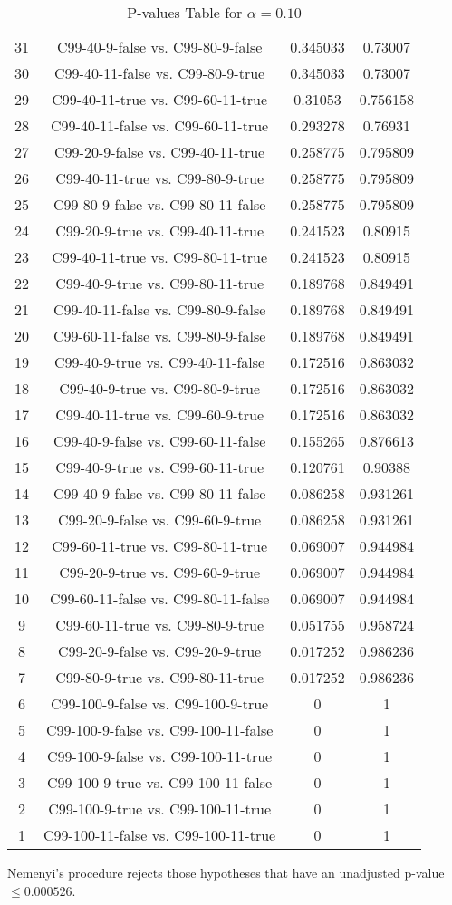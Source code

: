 \documentclass[a4paper,10pt]{article}
\begin{document}
\begin{landscape}
\begin{table}[!htp]
\begin{tabular}{cccc}
31&C99-40-9-false vs. C99-80-9-false&0.345033&0.73007\\
30&C99-40-11-false vs. C99-80-9-true&0.345033&0.73007\\
29&C99-40-11-true vs. C99-60-11-true&0.31053&0.756158\\
28&C99-40-11-false vs. C99-60-11-true&0.293278&0.76931\\
27&C99-20-9-false vs. C99-40-11-true&0.258775&0.795809\\
26&C99-40-11-true vs. C99-80-9-true&0.258775&0.795809\\
25&C99-80-9-false vs. C99-80-11-false&0.258775&0.795809\\
24&C99-20-9-true vs. C99-40-11-true&0.241523&0.80915\\
23&C99-40-11-true vs. C99-80-11-true&0.241523&0.80915\\
22&C99-40-9-true vs. C99-80-11-true&0.189768&0.849491\\
21&C99-40-11-false vs. C99-80-9-false&0.189768&0.849491\\
20&C99-60-11-false vs. C99-80-9-false&0.189768&0.849491\\
19&C99-40-9-true vs. C99-40-11-false&0.172516&0.863032\\
18&C99-40-9-true vs. C99-80-9-true&0.172516&0.863032\\
17&C99-40-11-true vs. C99-60-9-true&0.172516&0.863032\\
16&C99-40-9-false vs. C99-60-11-false&0.155265&0.876613\\
15&C99-40-9-true vs. C99-60-11-true&0.120761&0.90388\\
14&C99-40-9-false vs. C99-80-11-false&0.086258&0.931261\\
13&C99-20-9-false vs. C99-60-9-true&0.086258&0.931261\\
12&C99-60-11-true vs. C99-80-11-true&0.069007&0.944984\\
11&C99-20-9-true vs. C99-60-9-true&0.069007&0.944984\\
10&C99-60-11-false vs. C99-80-11-false&0.069007&0.944984\\
9&C99-60-11-true vs. C99-80-9-true&0.051755&0.958724\\
8&C99-20-9-false vs. C99-20-9-true&0.017252&0.986236\\
7&C99-80-9-true vs. C99-80-11-true&0.017252&0.986236\\
6&C99-100-9-false vs. C99-100-9-true&0&1\\
5&C99-100-9-false vs. C99-100-11-false&0&1\\
4&C99-100-9-false vs. C99-100-11-true&0&1\\
3&C99-100-9-true vs. C99-100-11-false&0&1\\
2&C99-100-9-true vs. C99-100-11-true&0&1\\
1&C99-100-11-false vs. C99-100-11-true&0&1\\
\hline
\end{tabular}
\caption{P-values Table for $\alpha=0.10$}
\end{table}Nemenyi's procedure rejects those hypotheses that have an unadjusted p-value $\le0.000526$.


\end{landscape}
\end{document}
